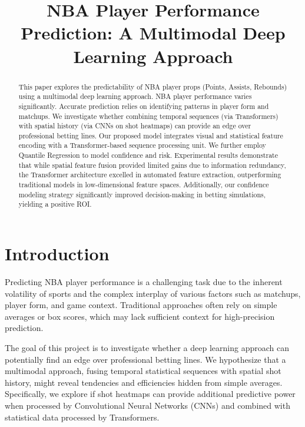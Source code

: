 \documentclass[conference]{IEEEtran}
\begin{document}
\title{NBA Player Performance Prediction: A Multimodal Deep Learning Approach}

\author{
}

\maketitle

\begin{abstract}
This paper explores the predictability of NBA player props (Points, Assists, Rebounds) using a multimodal deep learning approach. NBA player performance varies significantly. Accurate prediction relies on identifying patterns in player form and matchups. We investigate whether combining temporal sequences (via Transformers) with spatial history (via CNNs on shot heatmaps) can provide an edge over professional betting lines. Our proposed model integrates visual and statistical feature encoding with a Transformer-based sequence processing unit. We further employ Quantile Regression to model confidence and risk. Experimental results demonstrate that while spatial feature fusion provided limited gains due to information redundancy, the Transformer architecture excelled in automated feature extraction, outperforming traditional models in low-dimensional feature spaces. Additionally, our confidence modeling strategy significantly improved decision-making in betting simulations, yielding a positive ROI.
\end{abstract}


\section{Introduction}
Predicting NBA player performance is a challenging task due to the inherent volatility of sports and the complex interplay of various factors such as matchups, player form, and game context. Traditional approaches often rely on simple averages or box scores, which may lack sufficient context for high-precision prediction.

The goal of this project is to investigate whether a deep learning approach can potentially find an edge over professional betting lines. We hypothesize that a multimodal approach, fusing temporal statistical sequences with spatial shot history, might reveal tendencies and efficiencies hidden from simple averages. Specifically, we explore if shot heatmaps can provide additional predictive power when processed by Convolutional Neural Networks (CNNs) and combined with statistical data processed by Transformers.
\end{document}
